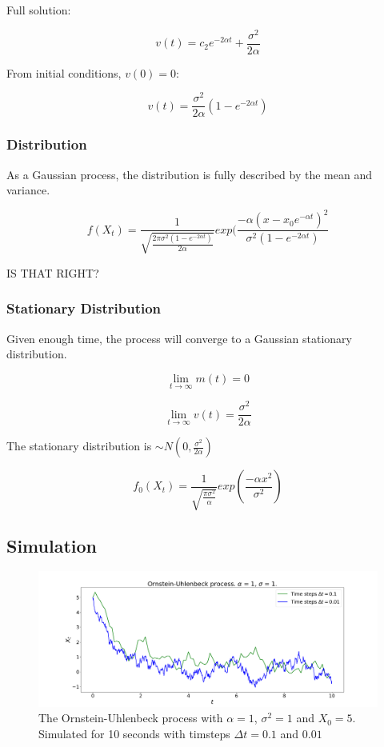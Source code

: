 \documentclass{article}
\begin{document}
Full solution:

$$ v(t) = c_2 e^{-2 \alpha t} + \frac{\sigma^2}{2 \alpha}$$

From initial conditions, $v(0) = 0$:

$$ v(t) = \frac{\sigma^2}{2 \alpha}(1-e^{-2 \alpha t})$$

\subsubsection{Distribution}

As a Gaussian process, the distribution is fully described by the mean and variance.

$$f(X_t) = \dfrac{1}{\sqrt{\frac{2 \pi \sigma^2 (1-e^{-2 \alpha t})}{2 \alpha}}}exp(\frac{- \alpha (x - x_0 e^{- \alpha t})^2}{\sigma^2 (1-e^{-2 \alpha t})}$$

IS THAT RIGHT?

\subsubsection{Stationary Distribution}

Given enough time, the process will converge to a Gaussian stationary distribution.  

$$\lim_{t \to \infty} m(t) = 0$$

$$\lim_{t \to \infty} v(t) = \frac{\sigma^2}{2 \alpha}$$

The stationary distribution is $\sim N(0,\frac{\sigma^2}{2 \alpha})$ 

$$f_0(X_t) = \dfrac{1}{\sqrt{\frac{\pi \sigma^2}{\alpha}}}exp(\frac{- \alpha x^2}{\sigma^2})$$

\subsection{Simulation}

\begin{figure}[H]
\includegraphics[scale=0.25]{ou_process_a.png} 
\caption{The Ornstein-Uhlenbeck process with $\alpha=1$, $\sigma^2=1$ and $X_0 = 5$. Simulated for 10 seconds with timsteps $\Delta t =0.1$ and $0.01$}
\label{fig:ou_process}
\end{figure}
\end{document}
